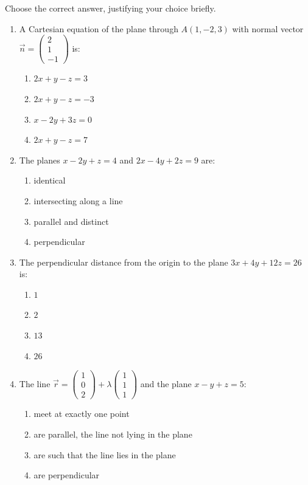 \documentclass[11pt]{article}
\begin{document}
\begin{exercice}
Choose the correct answer, justifying your choice briefly.
\begin{enumerate}
\item A Cartesian equation of the plane through $A(1,-2,3)$ with normal vector $\vec{n}=\begin{pmatrix}2\\1\\-1\end{pmatrix}$ is:
\begin{enumerate}
\item $2x+y-z=3$
\item $2x+y-z=-3$
\item $x-2y+3z=0$
\item $2x+y-z=7$
\end{enumerate}
\item The planes $x-2y+z=4$ and $2x-4y+2z=9$ are:
\begin{enumerate}
\item identical
\item intersecting along a line
\item parallel and distinct
\item perpendicular
\end{enumerate}
\item The perpendicular distance from the origin to the plane $3x+4y+12z=26$ is:
\begin{enumerate}
\item $1$
\item $2$
\item $13$
\item $26$
\end{enumerate}
\item The line $\vec{r}=\begin{pmatrix}1\\0\\2\end{pmatrix}+\lambda\begin{pmatrix}1\\1\\1\end{pmatrix}$ and the plane $x-y+z=5$:
\begin{enumerate}
\item meet at exactly one point
\item are parallel, the line not lying in the plane
\item are such that the line lies in the plane
\item are perpendicular
\end{enumerate}
\end{enumerate}
\end{exercice}
\end{document}
